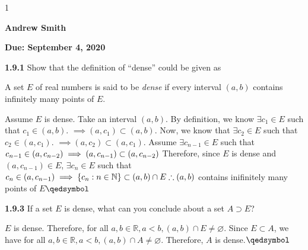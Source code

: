\documentclass[12pt]{article}
\newcommand{\duedate}{September 4, 2020}
\newcommand{\yourname}{Andrew Smith}
\def\printsolutions{1}
\newcommand{\N}{\mathbb{N}}
\newcommand{\R}{\mathbb{R}}
\begin{document}
\if\printsolutions1
\begin{center}
\textbf{\Large \yourname}
\end{center}
\else
\begin{center}
\textbf{\Large Due: \duedate}
\end{center}
\fi

\begin{problem}\textbf{1.9.1}
	Show that the definition of ``dense'' could be given as
	\begin{center}
		A set $E$ of real numbers is said to be \textit{dense} if every interval $(a,b)$ contains infinitely many points of $E$.
	\end{center}
\end{problem}
\begin{solution}\newline
Assume $E$ is dense. Take an interval $(a,b)$.\newline
By definition, we know $\exists c_1\in E$ such that $c_1\in(a,b)$.\newline
$\implies(a,c_1)\subset(a,b)$.\newline
Now, we know that $\exists c_2\in E$ such that $c_2\in(a,c_1)$.\newline
$\implies(a,c_2)\subset(a,c_1)$.\newline
	Assume $\exists c_{n-1}\in E$ such that $c_{n-1}\in (a,c_{n-2})\newline
	\implies (a,c_{n-1})\subset (a,c_{n-2})\newline$
	Therefore, since $E$ is dense and $(a,c_{n-1})\in E$, $\exists c_n\in E$ such that $c_n\in(a,c_{n-1})\newline
	\implies\{c_n:n\in\N\}\subset(a,b)\cap E\newline
	\therefore(a,b)$ contains inifinitely many points of $E$\flushright$\qedsymbol$


\end{solution}
\begin{problem}\textbf{1.9.3}
If a set $E$ is dense, what can you conclude about a set $A\supset E$?
\end{problem}
\begin{solution}\newline
$E$ is dense.\newline
Therefore, for all $a,b\in\R,a<b,(a,b)\cap E\neq\varnothing$.\newline
	Since $E\subset A$, we have for all $a,b\in\R,a<b,(a,b)\cap A\neq\varnothing$.\newline
	Therefore, $A$ is dense.\flushright$\qedsymbol$
\end{solution}
\end{document}
